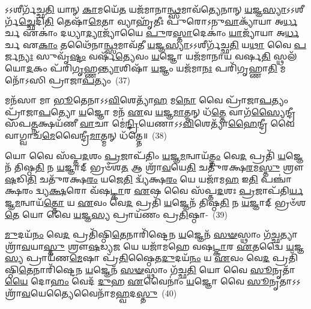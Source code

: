 𑌽𑌽𑌶𑍀𑌰𑍍𑌗᳴𑌚𑍍𑌛\-\ul{𑌤𑌿} 𑌯𑌾𑌨𑍍 \ul{𑌕𑌾}\-𑌮𑌯𑍇᳴\-\ul{𑌤} 𑌯𑌜᳴𑌮𑌾𑌨𑌾\-\ul{𑌨𑍍𑌥𑍍𑌸}\-𑌮𑌾𑌵᳴𑌤𑍍𑌯𑍇𑌨𑌾𑌨𑍍 \ul{𑌯}\-𑌜𑍍𑌞\-\ul{𑌸𑍍𑌯𑌾}\-\-𑌽\-𑌽𑌶𑍀𑌰𑍍𑌗᳴\-\ul{𑌚𑍍𑌛𑍇}\-𑌦𑌿\-\ul{𑌤𑌿} 𑌤𑍇𑌷𑌾᳴\-\ul{𑌮𑍇}\-𑌤𑌾 𑌵𑍍𑌯𑌾𑌹𑍃᳴𑌤𑍀𑌃 𑌪𑍁𑌰𑍋\-𑌽𑌨𑍁\-\ul{𑌵𑌾}\-𑌕𑍍𑌯𑌾᳴𑌯𑌾 𑌅\-\ul{𑌰𑍍𑌧}\-𑌰𑍍𑌚 𑌏𑌕𑌾𑌂॑ 𑌦𑌧𑍍𑌯𑌾\-\ul{𑌦𑍍𑌯𑌾}\-𑌜𑍍𑌯𑌾᳴𑌯𑍈 \ul{𑌪𑍁}\-𑌰\-\ul{𑌸𑍍𑌤𑌾}\-𑌦𑍇𑌕𑌾𑌂॑ \ul{𑌯𑌾}\-𑌜𑍍𑌯𑌾᳴𑌯𑌾 𑌅\-\ul{𑌰𑍍𑌧}\-𑌰𑍍𑌚 𑌏\-\ul{𑌕𑌾𑌂} 𑌤𑌥𑍈᳴𑌨𑌾\-\ul{𑌨𑍍𑌥𑍍𑌸}\-𑌮𑌾𑌵᳴𑌤𑍀 \ul{𑌯}\-𑌜𑍍𑌞\-\ul{𑌸𑍍𑌯𑌾}\-\-𑌽\-𑌽𑌶𑍀𑌰𑍍𑌗᳴𑌚𑍍𑌛\-\ul{𑌤𑌿} 𑌯\-\ul{𑌥𑌾} 𑌵𑍈 \ul{𑌪}\-𑌰𑍍𑌜\-\ul{𑌨𑍍𑌯𑌃} 𑌸𑍁𑌵𑍃᳴\-\ul{𑌷𑍍𑌟𑌂} 𑌵𑌰𑍍\mbox{}𑌷᳴\-\ul{𑌤𑍍𑌯𑍇}\-𑌵𑌂 \ul{𑌯}\-𑌜𑍍𑌞𑍋 𑌯𑌜᳴𑌮𑌾𑌨𑌾𑌯 𑌵𑌰𑍍\mbox{}𑌷\-\ul{𑌤𑌿} 𑌸𑍍𑌥𑌲᳴𑌯𑍋\-\ul{𑌦}\-𑌕𑌂 𑌪᳴𑌰𑌿\-\ul{𑌗𑍃}\-𑌹𑍍𑌣\-\ul{𑌨𑍍𑌤𑍍𑌯𑌾}\-𑌶𑌿𑌷𑌾᳴ \ul{𑌯}\-𑌜𑍍𑌞𑌂 𑌯𑌜᳴𑌮𑌾\-\ul{𑌨𑌃} 𑌪𑌰𑌿᳴𑌗𑍃𑌹𑍍𑌣𑌾\-\ul{𑌤𑌿} 𑌮𑌨𑍋᳴\-𑌽𑌸𑌿 𑌪𑍍𑌰𑌾𑌜𑌾\-\ul{𑌪}\-𑌤𑍍𑌯𑌂~(37)

𑌮𑌨᳴𑌸𑌾 𑌮𑌾 \ul{𑌭𑍂}\-𑌤𑍇𑌨𑌾\-𑌽\-𑌽\-\ul{𑌵𑌿}\-𑌶𑍇𑌤𑍍𑌯𑌾᳴\-\ul{𑌹} 𑌮\-\ul{𑌨𑍋} 𑌵𑍈 𑌪𑍍𑌰𑌾᳴𑌜𑌾\-\ul{𑌪}\-𑌤𑍍𑌯𑌂 𑌪𑍍𑌰𑌾᳴𑌜𑌾\-\ul{𑌪}\-𑌤𑍍𑌯𑍋 \ul{𑌯}\-𑌜𑍍𑌞𑍋 𑌮𑌨᳴ \ul{𑌏}\-𑌵 \ul{𑌯}\-𑌜𑍍𑌞\-\ul{𑌮𑌾}\-𑌤𑍍𑌮𑌨𑍍 𑌧᳴\-\ul{𑌤𑍍𑌤𑍇} 𑌵𑌾𑌗᳴\-\ul{𑌸𑍍𑌯𑍈}\-𑌨𑍍𑌦𑍍𑌰𑍀 𑌸᳴𑌪\-\ul{𑌤𑍍𑌨}\-𑌕𑍍𑌷𑌯᳴𑌣𑍀 \ul{𑌵𑌾}\-𑌚𑌾 𑌮𑍇॑\-\ul{𑌨𑍍𑌦𑍍𑌰𑌿}\-𑌯𑍇𑌣𑌾\-𑌽\-𑌽\-\ul{𑌵𑌿}\-𑌶𑍇𑌤𑍍𑌯𑌾᳴\-\ul{𑌹𑍈}\-𑌨𑍍𑌦𑍍𑌰𑍀 𑌵𑍈 𑌵𑌾𑌗𑍍𑌵𑌾𑌚᳴\-\ul{𑌮𑍇}\-𑌵𑍈𑌨𑍍𑌦𑍍𑌰𑍀\-\ul{𑌮𑌾}\-𑌤𑍍𑌮𑌨𑍍 𑌧᳴𑌤𑍍𑌤𑍇॥~(38)

{\anuvakamend[{𑌤𑍇\-\ul{𑌨𑍈}\-𑌵 𑌬𑍍𑌰𑌹𑍍𑌮᳴ \ul{𑌰𑌾}\-𑌷𑍍𑌟𑍍𑌰\-\ul{𑌮𑍇}\-𑌵𑌾𑌸𑍍𑌯᳴ \ul{𑌯}\-𑌜𑍍𑌞𑌸𑍍𑌯᳴ 𑌪𑍍𑌰𑌾𑌜𑌾\-\ul{𑌪}\-𑌤𑍍𑌯𑍞 𑌷𑌟𑍍𑌤𑍍𑌰𑌿𑍞᳴𑌶𑌚𑍍𑌚}]}%

𑌯𑍋 𑌵𑍈 𑌸᳴𑌪𑍍𑌤\-\ul{𑌦}\-𑌶𑌂 \ul{𑌪𑍍𑌰}\-𑌜𑌾𑌪᳴𑌤𑌿𑌂 \ul{𑌯}\-𑌜𑍍𑌞\-\ul{𑌮}\-𑌨𑍍𑌵𑌾𑌯᳴\-\ul{𑌤𑍍𑌤𑌂} 𑌵𑍇\-\ul{𑌦} 𑌪𑍍𑌰𑌤𑌿᳴ \ul{𑌯}\-𑌜𑍍𑌞𑍇𑌨᳴ 𑌤𑌿𑌷𑍍𑌠\-\ul{𑌤𑌿} 𑌨 \ul{𑌯}\-𑌜𑍍𑌞𑌾𑌦𑍍 𑌭𑍍𑌰𑍞᳴𑌶\-\ul{𑌤} 𑌆 𑌶𑍍𑌰𑌾᳴\-\ul{𑌵}\-𑌯𑍇\-\ul{𑌤𑌿} 𑌚𑌤𑍁᳴𑌰𑌕𑍍𑌷\-\ul{𑌰}\-𑌮\-\ul{𑌸𑍍𑌤𑍁} 𑌶𑍍𑌰𑍗\-\ul{𑌷}\-𑌡𑌿\-\ul{𑌤𑌿} 𑌚𑌤𑍁᳴𑌰𑌕𑍍𑌷\-\ul{𑌰𑌂} 𑌯𑌜𑍇\-\ul{𑌤𑌿} 𑌦𑍍𑌵𑍍𑌯᳴𑌕𑍍𑌷\-\ul{𑌰𑌂} 𑌯𑍇 𑌯𑌜𑌾᳴𑌮\-\ul{𑌹} 𑌇\-\ul{𑌤𑌿} 𑌪𑌞𑍍𑌚𑌾॑𑌕𑍍𑌷𑌰𑌂 𑌦𑍍𑌵𑍍𑌯\-\ul{𑌕𑍍𑌷}\-𑌰𑍋 𑌵᳴𑌷\-\ul{𑌟𑍍𑌕𑌾}\-𑌰 \ul{𑌏}\-𑌷 𑌵𑍈 𑌸᳴𑌪𑍍𑌤\-\ul{𑌦}\-𑌶𑌃 \ul{𑌪𑍍𑌰}\-𑌜𑌾𑌪᳴𑌤𑌿\-\ul{𑌰𑍍𑌯}\-𑌜𑍍𑌞\-\ul{𑌮}\-𑌨𑍍𑌵𑌾𑌯᳴\-\ul{𑌤𑍍𑌤𑍋} 𑌯 \ul{𑌏}\-𑌵𑌂 𑌵𑍇\-\ul{𑌦} 𑌪𑍍𑌰𑌤𑌿᳴ \ul{𑌯}\-𑌜𑍍𑌞𑍇𑌨᳴ 𑌤𑌿𑌷𑍍𑌠\-\ul{𑌤𑌿} 𑌨 \ul{𑌯}\-𑌜𑍍𑌞𑌾𑌦𑍍 𑌭𑍍𑌰𑍞᳴𑌶\-\ul{𑌤𑍇} 𑌯𑍋 𑌵𑍈 \ul{𑌯}\-𑌜𑍍𑌞\-\ul{𑌸𑍍𑌯} 𑌪𑍍𑌰𑌾𑌯᳴𑌣𑌂 𑌪𑍍𑌰\-\ul{𑌤𑌿}\-𑌷𑍍𑌠𑌾-~(39)

\-\ul{𑌮𑍁}\-𑌦𑌯᳴\-\ul{𑌨𑌂} 𑌵𑍇\-\ul{𑌦} 𑌪𑍍𑌰𑌤𑌿᳴𑌷𑍍𑌠𑌿\-\ul{𑌤𑍇}\-𑌨𑌾𑌰𑌿᳴𑌷𑍍𑌟𑍇𑌨 \ul{𑌯}\-𑌜𑍍𑌞𑍇𑌨᳴ \ul{𑌸}\-\-\ul{𑍟}\-𑌸𑍍𑌥𑌾𑌂 𑌗᳴\-\ul{𑌚𑍍𑌛}\-𑌤𑍍𑌯𑌾 𑌶𑍍𑌰𑌾᳴\-\ul{𑌵}\-𑌯𑌾\-\ul{𑌸𑍍𑌤𑍁} 𑌶𑍍𑌰𑍗\-\ul{𑌷}\-𑌡𑍍𑌯\-\ul{𑌜} 𑌯𑍇 𑌯𑌜𑌾᳴𑌮𑌹𑍇 𑌵𑌷\-\ul{𑌟𑍍𑌕𑌾}\-𑌰 \ul{𑌏}\-𑌤𑌦𑍍𑌵𑍈 \ul{𑌯}\-𑌜𑍍𑌞\-\ul{𑌸𑍍𑌯} 𑌪𑍍𑌰𑌾𑌯᳴𑌣\-\ul{𑌮𑍇}\-𑌷𑌾 𑌪𑍍𑌰᳴\-\ul{𑌤𑌿}\-𑌷𑍍𑌠𑍈𑌤\-\ul{𑌦𑍁}\-𑌦𑌯᳴\-\ul{𑌨𑌂} 𑌯 \ul{𑌏}\-𑌵𑌂 𑌵𑍇\-\ul{𑌦} 𑌪𑍍𑌰𑌤𑌿᳴𑌷𑍍𑌠𑌿\-\ul{𑌤𑍇}\-𑌨𑌾𑌰𑌿᳴𑌷𑍍𑌟𑍇𑌨 \ul{𑌯}\-𑌜𑍍𑌞𑍇𑌨᳴ \ul{𑌸}\-\-\ul{𑍟}\-𑌸𑍍𑌥𑌾𑌂 𑌗᳴𑌚𑍍𑌛\-\ul{𑌤𑌿} 𑌯𑍋 𑌵𑍈 \ul{𑌸𑍂}\-𑌨𑍃𑌤𑌾᳴\-\ul{𑌯𑍈} 𑌦𑍋\-\ul{𑌹𑌂} 𑌵𑍇𑌦᳴ \ul{𑌦𑍁}\-𑌹 \ul{𑌏}\-𑌵𑍈𑌨𑌾𑌂॑ \ul{𑌯}\-𑌜𑍍𑌞𑍋 𑌵𑍈 \ul{𑌸𑍂}\-𑌨𑍃𑌤𑌾\-𑌽\-𑌽𑌶𑍍𑌰𑌾᳴\-\ul{𑌵}\-𑌯𑍇𑌤𑍍𑌯𑍈𑌵𑍈𑌨𑌾᳴𑌮\-\ul{𑌹𑍍𑌵}\-𑌦\-\ul{𑌸𑍍𑌤𑍁}\-~(40)

